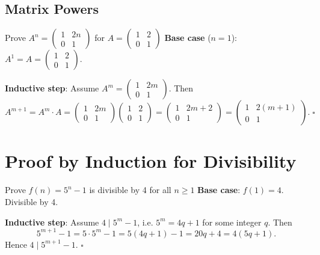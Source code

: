 \documentclass[12pt,a4paper]{article}
\theoremstyle{defstyle}
\begin{document}
\subsection{Matrix Powers}

\begin{example}{Prove $A^n=\begin{pmatrix}1&2n\\0&1\end{pmatrix}$ for $A=\begin{pmatrix}1&2\\0&1\end{pmatrix}$}{}
\textbf{Base case} (\(n=1\)): \(A^1=A=\begin{pmatrix}1&2\\0&1\end{pmatrix}\). \checkmark

\textbf{Inductive step}: Assume \(A^m=\begin{pmatrix}1&2m\\0&1\end{pmatrix}\). Then
\[
  A^{m+1}=A^m\cdot A=\begin{pmatrix}1&2m\\0&1\end{pmatrix}\begin{pmatrix}1&2\\0&1\end{pmatrix}
  =\begin{pmatrix}1&2m+2\\0&1\end{pmatrix}=\begin{pmatrix}1&2(m+1)\\0&1\end{pmatrix}. \;\square
\]
\end{example}

\section{Proof by Induction for Divisibility}

\begin{example}{Prove $f(n)=5^n-1$ is divisible by 4 for all $n\geq1$}{}
\textbf{Base case}: \(f(1)=4\). Divisible by 4. \checkmark

\textbf{Inductive step}: Assume \(4\mid 5^m-1\), i.e. \(5^m=4q+1\) for some integer \(q\). Then
\[
  5^{m+1}-1 = 5\cdot5^m-1 = 5(4q+1)-1 = 20q+4 = 4(5q+1).
\]
Hence \(4\mid 5^{m+1}-1\). \(\square\)
\end{example}
\end{document}
